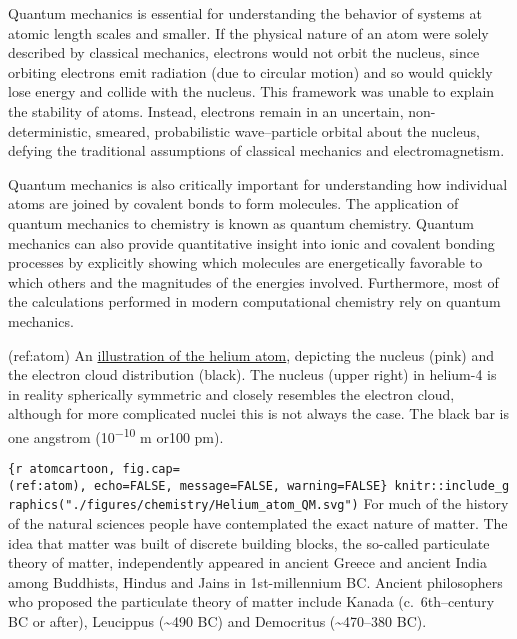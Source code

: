 \documentclass[
]{article}
\begin{document}
Quantum mechanics is essential for understanding the behavior of systems
at atomic length scales and smaller. If the physical nature of an atom
were solely described by classical mechanics, electrons would not orbit
the nucleus, since orbiting electrons emit radiation (due to circular
motion) and so would quickly lose energy and collide with the nucleus.
This framework was unable to explain the stability of atoms. Instead,
electrons remain in an uncertain, non-deterministic, smeared,
probabilistic wave--particle orbital about the nucleus, defying the
traditional assumptions of classical mechanics and electromagnetism.

Quantum mechanics is also critically important for understanding how
individual atoms are joined by covalent bonds to form molecules. The
application of quantum mechanics to chemistry is known as quantum
chemistry. Quantum mechanics can also provide quantitative insight into
ionic and covalent bonding processes by explicitly showing which
molecules are energetically favorable to which others and the magnitudes
of the energies involved. Furthermore, most of the calculations
performed in modern computational chemistry rely on quantum mechanics.

(ref:atom) An
\href{https://commons.wikimedia.org/wiki/File:Helium_atom_QM.svg}{illustration
of the helium atom}, depicting the nucleus (pink) and the electron cloud
distribution (black). The nucleus (upper right) in helium-4 is in
reality spherically symmetric and closely resembles the electron cloud,
although for more complicated nuclei this is not always the case. The
black bar is one angstrom (10\textsuperscript{−10} m or100 pm).

\texttt{\{r\ atomcartoon,\ fig.cap=\textquotesingle{}(ref:atom)\textquotesingle{},\ echo=FALSE,\ message=FALSE,\ warning=FALSE\}\ knitr::include\_graphics("./figures/chemistry/Helium\_atom\_QM.svg")}
For much of the history of the natural sciences people have contemplated
the exact nature of matter. The idea that matter was built of discrete
building blocks, the so-called particulate theory of matter,
independently appeared in ancient Greece and ancient India among
Buddhists, Hindus and Jains in 1st-millennium BC. Ancient philosophers
who proposed the particulate theory of matter include Kanada
(c.~6th--century BC or after), Leucippus (\textasciitilde490 BC) and
Democritus (\textasciitilde470--380 BC).
\end{document}

